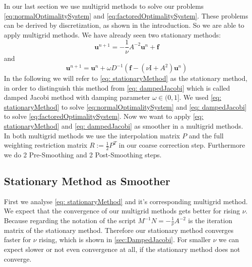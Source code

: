 \documentclass{amsart}
\theoremstyle{definition}
\theoremstyle{remark}
\numberwithin{equation}{section}
\newcommand{\Id}{\mathrm{I}}
\renewcommand{\vec}{\textbf}
\begin{document}

In our last section we use multigrid methods to solve our problems \eqref{eq:normalOptimalitySystem} and \ref{eq:factoredOptimalitySystem}. These problems can be derived by discretization, as shown in the introduction. So we are able to apply multigrid methods. We have already seen two stationary methods:
\begin{equation}
\vec{u}^{n+1}    = - \frac{1}{\nu} A^{-2} \vec{u}^n+ \vec{f}
\label{eq: stationaryMethod}
\end{equation}
and 
\begin{equation}
\vec{u}^{n+1}    =  \vec{u}^n+ \omega D^{-1}  (\vec{f} - (\nu \Id + A^2) \vec{u}^n)
\label{eq: dampedJacobi}
\end{equation}
In the following we will refer to \eqref{eq: stationaryMethod} as the stationary method, in order to distinguish this method from \eqref{eq: dampedJacobi} which is called damped Jacobi method with damping parameter $\omega \in (0,1] $. We used \eqref{eq: stationaryMethod} to solve  \eqref{eq:normalOptimalitySystem} and \eqref{eq: dampedJacobi} to solve \eqref{eq:factoredOptimalitySystem}. Now we want to apply \eqref{eq: stationaryMethod} and \eqref{eq: dampedJacobi} as smoother in a multigrid methods. In both multigrid methods we use the interpolation matrix $P$ and the full weighting restriction matrix $R:= \frac{1}{2} P^T$  in our coarse correction step. Furthermore we do 2 Pre-Smoothing and 2 Post-Smoothing steps. 
\subsection{Stationary Method as Smoother}
First we analyse \eqref{eq: stationaryMethod} and it's corresponding multigrid method. We expect that the convergence of our multigrid methods gets better for rising $\nu$. Because regarding the notation of the script $M^{-1} N = - \frac{1}{\nu} A^{-2} $ is the iteration matrix of the stationary method. Therefore our stationary method converges faster for $\nu $ rising, which is shown in \ref{sec:DampedJacobi}. For smaller $\nu$ we can expect slower or not even convergence at all, if the stationary method does not converge. 
\end{document}
